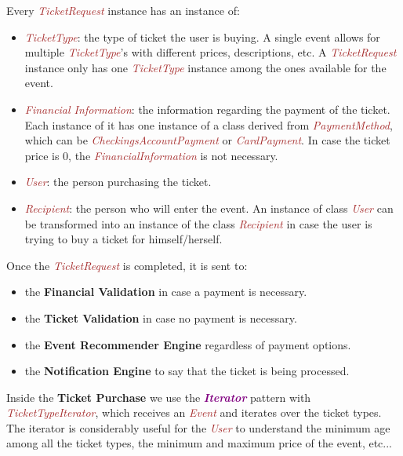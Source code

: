 \documentclass{article}
\newcommand{\designpattern}[1]{\textbf{\textit{\textcolor{purple}{#1}}}}
\newcommand{\designclass}[1]{\textit{\textcolor{brown}{#1}}}
\newcommand{\application}[1]{\textbf{\textcolor{codegreen}{#1}}}
\begin{document}
Every \designclass{TicketRequest} instance has an instance of:
\begin{itemize}
    \item \designclass{TicketType}: the type of ticket the user is buying. A single event allows for multiple \designclass{TicketType}'s with different prices, descriptions, etc. A \designclass{TicketRequest} instance only has one \designclass{TicketType} instance among the ones available for the event.
    \item \designclass{Financial Information}: the information regarding the payment of the ticket. Each instance of it has one instance of a class derived from \designclass{PaymentMethod}, which can be \designclass{CheckingsAccountPayment} or \designclass{CardPayment}. In case the ticket price is 0, the \designclass{FinancialInformation} is not necessary.
    \item \designclass{User}: the person purchasing the ticket.
    \item \designclass{Recipient}: the person who will enter the event. An instance of class \designclass{User} can be transformed into an instance of the class \designclass{Recipient} in case the user is trying to buy a ticket for himself/herself.
\end{itemize}

Once the \designclass{TicketRequest} is completed, it is sent to:
\begin{itemize}
    \item the \application{Financial Validation} in case a payment is necessary.
    \item the \application{Ticket Validation} in case no payment is necessary.
    \item the \application{Event Recommender Engine} regardless of payment options.
    \item the \application{Notification Engine} to say that the ticket is being processed.
\end{itemize}

Inside the \application{Ticket Purchase} we use the \designpattern{Iterator} pattern with \designclass{TicketTypeIterator}, which receives an \designclass{Event} and iterates over the ticket types. The iterator is considerably useful for the \designclass{User} to understand the minimum age among all the ticket types, the minimum and maximum price of the event, etc...
\end{document}
